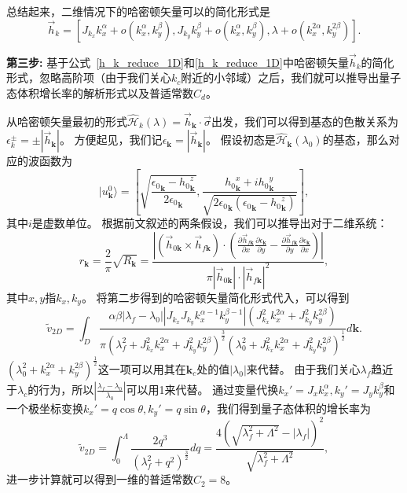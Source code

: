 			总结起来，二维情况下的哈密顿矢量可以的简化形式是
			\begin{equation} \label{h_k_reduce_2D}
				\vec{h}_k = [J_{k_x} k_x^{\alpha} + o(k_x^{\alpha} ,k_y^{\beta}), J_{k_y} k_y^{\beta} + o(k_x^{\alpha} ,k_y^{\beta}), \lambda + o(k_x^{2\alpha} ,k_y^{2\beta})].
			\end{equation}
		
			{\bf 第三步:}
			基于公式~\eqref{h_k_reduce_1D}和\eqref{h_k_reduce_1D}中哈密顿矢量$\vec{h}_k$的简化形式，忽略高阶项（由于我们关心$k_c$附近的小邻域）之后，我们就可以推导出量子态体积增长率的解析形式以及普适常数$C_d$。
			
			从哈密顿矢量最初的形式$\hat{\mathcal{H}}_k(\lambda)=\vec{h}_\mathbf{k}\cdot \vec{\sigma}$出发，我们可以得到基态的色散关系为$\epsilon_k^{\pm}=\pm|\vec{h}_\mathbf{k}|$。
			方便起见，我们记$\epsilon_\mathbf{k}=|\vec{h}_\mathbf{k}|$。
			假设初态是$\hat{\mathcal{H}}_\mathbf{k}(\lambda_0)$的基态，那么对应的波函数为
			\begin{equation}\label{phi0}
				|u_\mathbf{k}^0 \rangle=
				\left[\sqrt{\frac{{{\epsilon_0}_\mathbf{k}-{h_0}_\mathbf{k}^z}}{2{\epsilon_0}_\mathbf{k}}},
				\frac{{h_0}_\mathbf{k}^x+ i {h_0}_\mathbf{k}^y}{\sqrt{2{\epsilon_0}_\mathbf{k}({\epsilon_0}_\mathbf{k}-{h_0}_\mathbf{k}^z)}}\right],
			\end{equation}
			其中$i$是虚数单位。
			根据前文叙述的两条假设，我们可以推导出对于二维系统：
			\begin{equation} \label{Eq:rk_2D}
				r_\mathbf{k} = \frac2\pi \sqrt{R_\mathbf{k}} =\frac{\left|({\vec{h}}_{0\mathbf{k}} \times {\vec{h}}_{f\mathbf{k}}) \cdot (\frac{\partial {\vec{h}}_{f\mathbf{k}}}{\partial x} \frac{\partial \epsilon_\mathbf{k}}{\partial y} - \frac{\partial {\vec{h}}_{f\mathbf{k}}}{\partial y} \frac{\partial \epsilon_\mathbf{k}}{\partial x})\right|}{\pi|{\vec{h}}_{0\mathbf{k}}| \cdot |{\vec{h}}_{f\mathbf{k}}|^2},
			\end{equation}
			其中$x, y$指$k_x, k_y$。
			将第二步得到的哈密顿矢量简化形式代入，可以得到
			\begin{equation}
				\tilde{v}_{2D} = \int_{D}{\frac{\alpha \beta |\lambda_f-\lambda_0||J_{k_x}J_{k_y}k_x^{\alpha-1} k_y^{\beta-1}|(J_{k_x}^2k_x^{2\alpha}+J_{k_y}^2k_y^{2\beta})}{\pi(\lambda_f^2+J_{k_x}^2k_x^{2\alpha}+J_{k_y}^2k_y^{2\beta})^{\frac32}(\lambda_0^2+J_{k_x}^2k_x^{2\alpha}+J_{k_y}^2k_y^{2\beta})^{\frac12}} d\mathbf{k}}.
			\end{equation}
			$(\lambda_0^2+k_x^{2\alpha}+k_y^{2\beta})^{\frac12}$这一项可以用其在$\mathbf{k}_c$处的值$|\lambda_0|$来代替。
			由于我们关心$\lambda_f$趋近于$\lambda_c$的行为，所以$|\frac{\lambda_f-\lambda_0}{\lambda_0}|$可以用1来代替。
			通过变量代换$k_x'=J_x k_x^\alpha,k_y'=J_y k_y^\beta$和一个极坐标变换$k_x'=q\cos{\theta},k_y'=q\sin{\theta}$，我们得到量子态体积的增长率为
			\begin{equation}
				\tilde{v}_{2D} = \int_{0}^{\Lambda}{\frac{2q^3}{(\lambda_f^2+q^2)^\frac32}}dq
				= \frac{4(\sqrt{\lambda_f^2+\Lambda^2}-|\lambda_f|)^2}{\sqrt{\lambda_f^2+\Lambda^2}},
			\end{equation}
			进一步计算就可以得到一维的普适常数$C_2=8$。			
			
